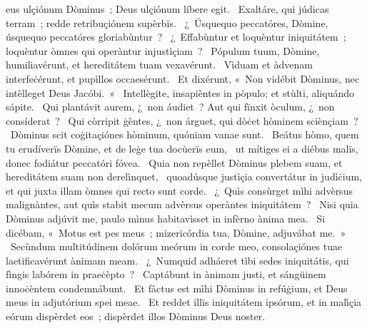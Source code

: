 { }
{%
eus ulçiónum Dòminus~; Deus ulçiónum líbere egit. 
~Exaltáre, qui júdicas terram~; redde retribuçiónem supèrbïs. 
~¿~Úsquequo peccatóres, Dòmine, úsquequo peccatóres gloriabùntur~? 
~¿~Effabùntur et loquèntur iniquitátem~; loquèntur òmnes qui operàntur injustìçiam~? 
~Pópulum tuum, Dòmine, humiliavérunt, et hereditátem tuam vexavérunt. 
~Vìduam et àdvenam interfeċérunt, et pupìllos occaesérunt. 
~Et dixérunt, «~Non vidébit Dòminus, nec intèlleget Deus Jacóbi.~»
~Intellègite, insapièntes in pòpulo; et stùlti, aliquándo sápite. 
~Qui plantávit aurem, ¿~non áudiet~? Aut qui fïnxit òculum, ¿~non consíderat~? 
~Qui còrripit ġèntes, ¿~non árguet, qui dòċet hòminem sciènçiam~? 
~Dòminus scit coġitaçiónes hòminum, quóniam vanae sunt. 
~Beátus hòmo, quem tu erudíverïs Dòmine, et de leġe tua docùerïs eum, 
~ut mítiges ei a diébus malïs, donec fodiátur peccatóri fóvea. 
~Quia non repèllet Dòminus plebem suam, et hereditátem suam non derelìnquet, 
~quoadúsque justìçia convertátur in judìċium, et qui juxta illam òmnes qui recto sunt corde. 
~¿~Quìs consùrget mìhi advèrsus malignàntes, aut quìs stabit mecum advèrsus operàntes iniquitátem~? 
~Nisi quia Dòminus adjúvit me, paulo mìnus habitavìsset in infèrno ànima mea. 
~Si dicébam, «~Motus est pes meus~; mizericórdia tua, Dòmine, adjuvábat me.~»
~Secùndum multitúdinem dolórum meórum in corde meo, consolaçiónes tuae laetificavérunt ànimam meam. 
~¿~Numquid adháeret tìbi sedes iniquitátis, qui fìngis labórem in praeċèpto~? 
~Captábunt in ànimam justi, et sángüinem innoċèntem condemnábunt. 
~Et fàctus est mìhi Dòminus in refúġium, et Deus meus in adjutórium spei meae. 
~Et reddet illïs iniquitátem ipsórum, et in malìçia eórum dispèrdet eos~; dispèrdet illos Dòminus Deus noster. 
}
